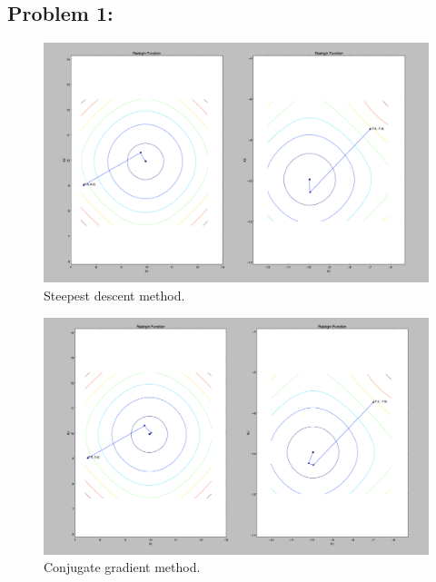 \documentclass{article}
\begin{document}
 

\hypertarget{}{}
\subsection*{{Problem 1: }}
\label{}


\begin{figure}[h]
\includegraphics[width=\textwidth]{image/steepest_descent}
\centering
\caption{Steepest descent method. }
\end{figure} 

\begin{figure}[h]
\includegraphics[width=\textwidth]{image/conjugate_gradient}
\centering
\caption{Conjugate gradient method. }
\end{figure} 
\end{document}
